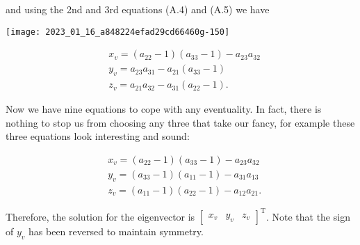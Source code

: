 and using the 2nd and 3rd equations (A.4) and (A.5) we have

\begin{center}
\texttt{[image: 2023\_01\_16\_a848224efad29cd66460g-150]}
\end{center}

$$
\begin{aligned}
& x_{v}=\left(a_{22}-1\right)\left(a_{33}-1\right)-a_{23} a_{32} \\
& y_{v}=a_{23} a_{31}-a_{21}\left(a_{33}-1\right) \\
& z_{v}=a_{21} a_{32}-a_{31}\left(a_{22}-1\right) .
\end{aligned}
$$

Now we have nine equations to cope with any eventuality. In fact, there is nothing to stop us from choosing any three that take our fancy, for example these three equations look interesting and sound:

$$
\begin{aligned}
& x_{v}=\left(a_{22}-1\right)\left(a_{33}-1\right)-a_{23} a_{32} \\
& y_{v}=\left(a_{33}-1\right)\left(a_{11}-1\right)-a_{31} a_{13} \\
& z_{v}=\left(a_{11}-1\right)\left(a_{22}-1\right)-a_{12} a_{21} .
\end{aligned}
$$

Therefore, the solution for the eigenvector is $\left[\begin{array}{lll}x_{v} & y_{v} & z_{v}\end{array}\right]^{\mathrm{T}}$. Note that the sign of $y_{v}$ has been reversed to maintain symmetry.
